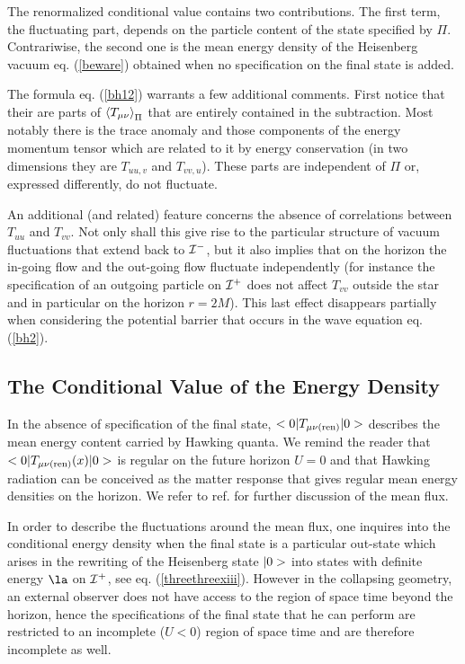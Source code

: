 The renormalized conditional value contains two contributions.
The first term, the fluctuating part, depends on the particle content of the
state specified by $\Pi$. Contrariwise,  the second one is the
mean energy density of the
Heisenberg vacuum
eq. (\ref{beware}) obtained when no specification on the final state is added.

The formula eq. (\ref{bh12})
 warrants a few additional comments. First notice that their are
parts of $\mbox{$ \langle T_{\mu\nu} \rangle $}_{\Pi}$
that are
entirely contained in the subtraction.
Most notably there is the trace anomaly and those components of the
energy
momentum tensor which are related to it by energy conservation
(in two dimensions they are $T_{uu,v}$ and $T_{vv,u}$). These parts
are
independent of $\Pi$ or, expressed differently, do not
fluctuate.

An additional (and related)  feature
concerns the absence of correlations between $T_{uu}$ and $T_{vv}$.
Not only shall this give rise to the particular structure of vacuum
fluctuations that extend back to ${\cal I}^-$, but it also implies that on the
horizon the in-going flow and the out-going flow fluctuate independently (for
instance the specification of an outgoing particle on ${\cal I}^+$ does not
affect $T_{vv}$ outside the star and in particular
 on the horizon $r=2M$). This last effect disappears partially
when considering the potential barrier that occurs in the wave equation
eq. (\ref{bh2}).

\subsection{The Conditional Value of the Energy Density}\label{bbb}

In the absence of specification of the final state, $\mbox{$ \mbox{$ < 0 \vert $} T_{\mu \nu
({\rm ren})} \mbox{$ \vert 0 > $} $}$ describes the mean energy content carried by Hawking
quanta. We  remind the reader that $\mbox{$ \mbox{$ < 0 \vert $} T_{\mu \nu
({\rm ren})} (x) \mbox{$ \vert 0 > $} $}$ is regular on the future horizon $U=0$ and that
Hawking radiation can be conceived as the matter
response  that gives regular mean energy densities on the horizon.
 We refer to ref. \cite{birreld} for further discussion of the mean flux.




In order to describe the fluctuations around the mean flux, one inquires
into the conditional energy density when the final state is a particular
out-state which arises in the rewriting of the Heisenberg state $\mbox{$ \vert 0 > $}$ into
states with definite energy $\la$ on $\cal{I}^+$,
see eq. (\ref{threethreexiii}).
However in the collapsing geometry,
an external observer does not have access to the region of space time
beyond  the horizon, hence the specifications of the final state
that he can perform are
restricted to an incomplete ($U<0$) region of space time and are therefore
incomplete as well.

